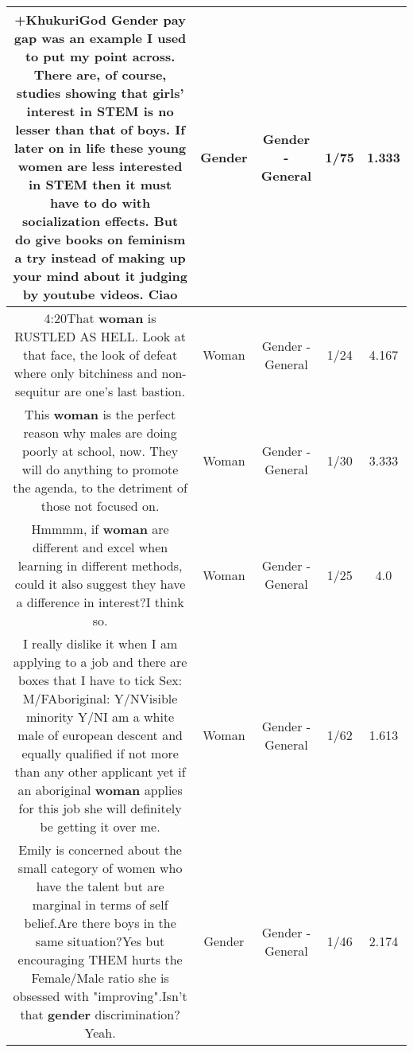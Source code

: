 \documentclass[11pt]{article}
\newlength\mylength
\begin{document}
\begin{center}
\begin{longtable}{|C{.65\mylength}|C{.30\mylength}|C{.12\mylength}|C{.12\mylength}|C{.12\mylength}|}
  \small +KhukuriGod \textbf{Gender} pay gap was an example I used to put my point across. There are, of course, studies showing that girls' interest in STEM is no lesser than that of boys. If later on in life these young women are less interested in STEM then it must have to do with socialization effects. But do give books on feminism a try instead of making up your mind about it judging by youtube videos. Ciao\normalsize   & Gender & Gender - General & 1/75 & 1.333 \\  \hline
  \small 4:20That \textbf{woman} is RUSTLED AS HELL. Look at that face, the look of defeat where only bitchiness and non-sequitur are one's last bastion.\normalsize   & Woman & Gender - General & 1/24 & 4.167 \\  \hline
  \small This \textbf{woman} is the perfect reason why males are doing poorly at school, now. They will do anything to promote the agenda, to the detriment of those not focused on.\normalsize   & Woman & Gender - General & 1/30 & 3.333 \\  \hline
  \small Hmmmm, if \textbf{woman} are different and excel when learning in different methods, could it also suggest they have a difference in interest?I think so.\normalsize   & Woman & Gender - General & 1/25 & 4.0 \\  \hline
  \small I really dislike it when I am applying to a job and there are boxes that I have to tick Sex: M/FAboriginal: Y/NVisible minority Y/NI am a white male of european descent and equally qualified if not more than any other applicant yet if an aboriginal \textbf{woman} applies for this job she will definitely be getting it over me.\normalsize   & Woman & Gender - General & 1/62 & 1.613 \\  \hline
  \small Emily is concerned about the small category of women who have the talent but are marginal in terms of self belief.Are there boys in the same situation?Yes but encouraging THEM hurts the Female/Male ratio she is obsessed with "improving".Isn't that \textbf{gender} discrimination?Yeah.\normalsize   & Gender & Gender - General & 1/46 & 2.174 \\  \hline

\end{longtable}
\end{center}
\end{document}
